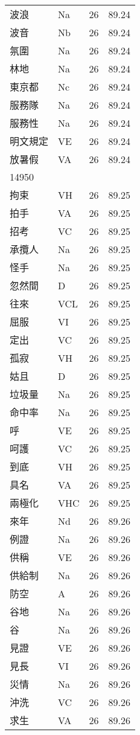 \documentclass[twocolumn]{book}
\begin{document}
\begin{supertabular}{llrr}
波浪 & Na & 26 &  89.24\\
波音 & Nb & 26 &  89.24\\
氛圍 & Na & 26 &  89.24\\
林地 & Na & 26 &  89.24\\
東京都 & Nc & 26 &  89.24\\
服務隊 & Na & 26 &  89.24\\
服務性 & Na & 26 &  89.24\\
明文規定 & VE & 26 &  89.24\\
放暑假 & VA & 26 &  89.24\\
14950\\
拘束 & VH & 26 &  89.25\\
拍手 & VA & 26 &  89.25\\
招考 & VC & 26 &  89.25\\
承攬人 & Na & 26 &  89.25\\
怪手 & Na & 26 &  89.25\\
忽然間 & D & 26 &  89.25\\
往來 & VCL & 26 &  89.25\\
屈服 & VI & 26 &  89.25\\
定出 & VC & 26 &  89.25\\
孤寂 & VH & 26 &  89.25\\
姑且 & D & 26 &  89.25\\
垃圾量 & Na & 26 &  89.25\\
命中率 & Na & 26 &  89.25\\
呼 & VE & 26 &  89.25\\
呵護 & VC & 26 &  89.25\\
到底 & VH & 26 &  89.25\\
具名 & VA & 26 &  89.25\\
兩極化 & VHC & 26 &  89.25\\
來年 & Nd & 26 &  89.26\\
例證 & Na & 26 &  89.26\\
供稱 & VE & 26 &  89.26\\
供給制 & Na & 26 &  89.26\\
防空 & A & 26 &  89.26\\
谷地 & Na & 26 &  89.26\\
谷 & Na & 26 &  89.26\\
見證 & VE & 26 &  89.26\\
見長 & VI & 26 &  89.26\\
災情 & Na & 26 &  89.26\\
沖洗 & VC & 26 &  89.26\\
求生 & VA & 26 &  89.26\\

\end{supertabular}
\end{document}
